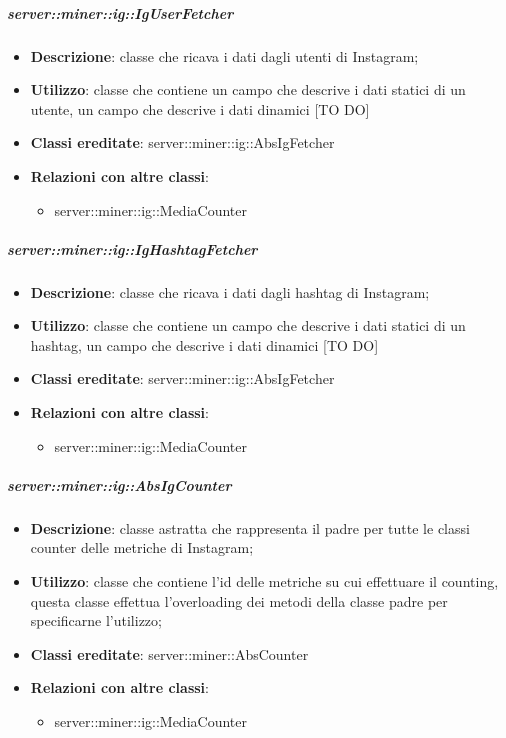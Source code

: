 	\subparagraph{server::miner::ig::IgUserFetcher} %
		\label{subp:server_miner_ig_IgUserFetcher}
			\begin{itemize}
				\item \textbf{Descrizione}: classe che ricava i dati dagli utenti di Instagram;
				\item \textbf{Utilizzo}: classe che contiene un campo che descrive i dati statici di un utente, un campo che descrive i dati dinamici [TO DO]
				\item \textbf{Classi ereditate}: server::miner::ig::AbsIgFetcher
				\item \textbf{Relazioni con altre classi}:
					\begin{itemize}
						\item server::miner::ig::MediaCounter
					\end{itemize}
			\end{itemize}

	\subparagraph{server::miner::ig::IgHashtagFetcher} %
		\label{subp:server_miner_ig_IgHashtagFetcher}
			\begin{itemize}
				\item \textbf{Descrizione}: classe che ricava i dati dagli hashtag di Instagram;
				\item \textbf{Utilizzo}: classe che contiene un campo che descrive i dati statici di un hashtag, un campo che descrive i dati dinamici [TO DO]
				\item \textbf{Classi ereditate}: server::miner::ig::AbsIgFetcher
				\item \textbf{Relazioni con altre classi}:
					\begin{itemize}
						\item server::miner::ig::MediaCounter
					\end{itemize}
			\end{itemize}

	\subparagraph{server::miner::ig::AbsIgCounter} %
		\label{subp:server_miner_ig_AbsIgCounter}
			\begin{itemize}
				\item \textbf{Descrizione}: classe astratta che rappresenta il padre per tutte le classi counter delle metriche di Instagram;
				\item \textbf{Utilizzo}: classe che contiene l’id delle metriche su cui effettuare il counting, questa classe effettua l'overloading dei metodi della classe padre per specificarne l’utilizzo;
				\item \textbf{Classi ereditate}: server::miner::AbsCounter
				\item \textbf{Relazioni con altre classi}:
					\begin{itemize}
						\item server::miner::ig::MediaCounter
					\end{itemize}
			\end{itemize}


